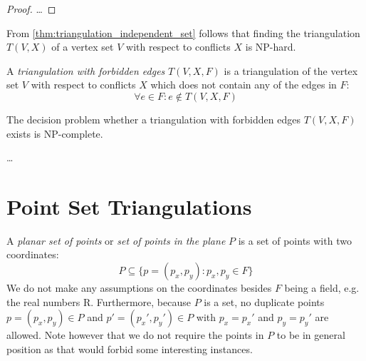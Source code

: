 \begin{proof}
  \ldots{}
\end{proof}

\begin{theorem}
  From \cref{thm:triangulation_independent_set} follows that
  finding the triangulation \(T(V,X)\) of a vertex set \(V\) with 
  respect to conflicts \(X\) is NP-hard.
\end{theorem}


\begin{definition}
  A \emph{triangulation with forbidden edges} \(T(V,X,F)\) is a 
  triangulation of the vertex set \(V\) with respect to conflicts
  \(X\) which does not contain any of the edges in \(F\):
  \[ \forall e \in F : e \not\in T(V,X,F) \]
\end{definition}


\begin{theorem}
  The decision problem whether a triangulation with forbidden edges
  \(T(V,X,F)\) exists is NP-complete.
\end{theorem}

\begin{definition}
  \label{def:constrained_triangulation}
  \ldots{}
\end{definition}

\section{Point Set Triangulations}


\begin{definition}
  A \emph{planar set of points} or \emph{set of points in the plane}
  \(P\) is a set of points with two coordinates:
  \[ P \subseteq \{p = (p_x,p_y) : p_x,p_y \in F\} \]
  We do not make any assumptions on the coordinates besides \(F\)
  being a field, e.g. the real numbers \gls{R}. Furthermore,
  because \(P\) is a set, no duplicate points \(p=(p_x,p_y)\in P\) and
  \(p'=(p_x',p_y')\in P\) with \(p_x=p_x'\) and \(p_y=p_y'\) are allowed.
  Note however that we do not require the points in \(P\) to be in 
  general position as that would forbid some interesting instances.
\end{definition}

